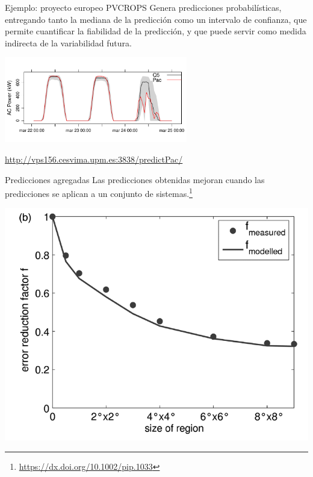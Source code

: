 \documentclass[aspectratio=169, usenames,svgnames,dvipsnames]{beamer}
\begin{document}
\begin{frame}[label={sec:orgfa02aa8}]{Ejemplo: proyecto europeo PVCROPS}
Genera \alert{predicciones probabilísticas}, entregando tanto la mediana de la
predicción como un intervalo de confianza, que permite cuantificar la
fiabilidad de la predicción, y que puede servir como medida indirecta
de la variabilidad futura.

\begin{center}
\includegraphics[width=0.6\textwidth]{../figs/powerResult.pdf}
\end{center}

\begin{center}
\url{http://vps156.cesvima.upm.es:3838/predictPac/}
\end{center}
\end{frame}


\begin{frame}[label={sec:org5d6368f}]{Predicciones agregadas}
Las predicciones obtenidas mejoran cuando las predicciones se aplican
a un conjunto de sistemas.\footnote{\url{https://dx.doi.org/10.1002/pip.1033}}

\begin{center}
\includegraphics[height=0.7\textheight]{../figs/ForecastEnsembleErrorReduction.png}
\end{center}
\end{frame}
\end{document}
